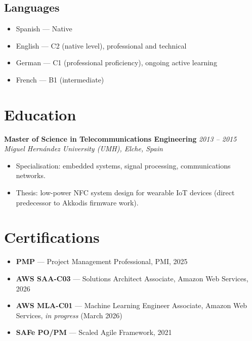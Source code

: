 \documentclass[10pt,a4paper]{article}
\newcommand{\roleentry}[3]{%
  \vspace{4pt}%
  \textbf{#1} \hfill \textit{#2}\\%
  \textit{\small #3}\\[-2pt]%
}
\begin{document}
\subsection*{Languages}
\begin{itemize}
  \item Spanish — Native
  \item English — C2 (native level), professional and technical
  \item German — C1 (professional proficiency), ongoing active learning
  \item French — B1 (intermediate)
\end{itemize}

\section{Education}

\roleentry{Master of Science in Telecommunications Engineering}
  {2013 – 2015}
  {Miguel Hernández University (UMH), Elche, Spain}

\begin{itemize}
  \item Specialisation: embedded systems, signal processing, communications networks.
  \item Thesis: low-power NFC system design for wearable IoT devices (direct predecessor to Akkodis firmware work).
\end{itemize}

\section{Certifications}

\begin{itemize}
  \item \textbf{PMP} — Project Management Professional, PMI, 2025
  \item \textbf{AWS SAA-C03} — Solutions Architect Associate, Amazon Web Services, 2026
  \item \textbf{AWS MLA-C01} — Machine Learning Engineer Associate, Amazon Web Services, \textit{in progress} (March 2026)
  \item \textbf{SAFe PO/PM} — Scaled Agile Framework, 2021
\end{itemize}
\end{document}
